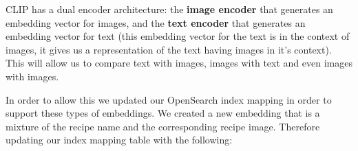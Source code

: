 \documentclass[runningheads]{llncs}
\begin{document}
CLIP has a dual encoder architecture: the \textbf{image encoder} that generates an embedding vector for images, and the \textbf{text encoder} that generates an embedding vector for text (this embedding vector for the text is in the context of images, it gives us a representation of the text having images in it's context). This will allow us to compare text with images, images with text and even images with images.

In order to allow this we updated our OpenSearch index mapping in order to support these types of embeddings. We created a new embedding that is a mixture of the recipe name and the corresponding recipe image. Therefore updating our index mapping table with the following:

\begin{table}[ht]
\centering
\setlength{\abovecaptionskip}{10pt} %
\caption{Updated Index Mapping}
\label{tab:mappings}
\end{table}
\end{document}

